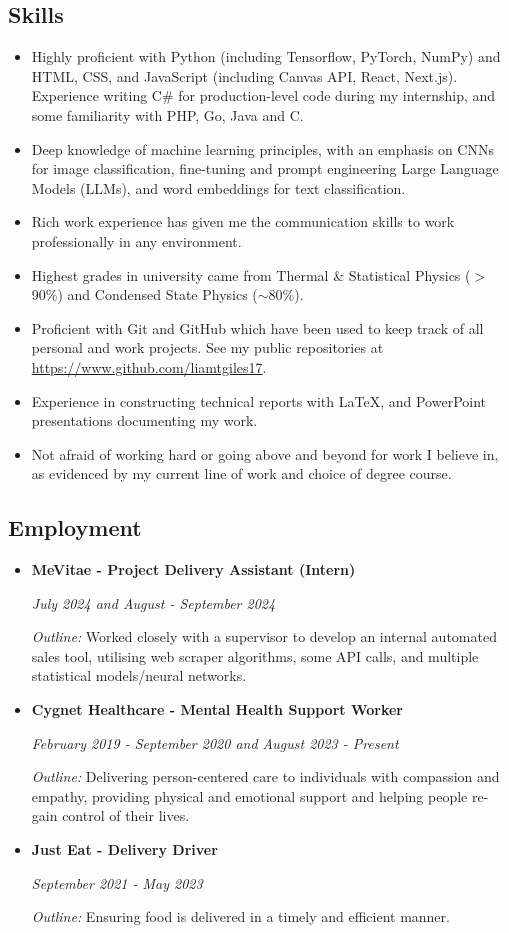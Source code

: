 \documentclass[11pt, a4paper, draft]{article}
\begin{document}
\subsection*{Skills}
\begin{itemize}
    \item Highly proficient with Python (including Tensorflow, PyTorch, NumPy) and HTML, CSS, and JavaScript (including Canvas API, React, Next.js). Experience writing C\# for production-level code during my internship, and some familiarity with PHP, Go, Java and C.
    \item Deep knowledge of machine learning principles, with an emphasis on CNNs for image classification, fine-tuning and prompt engineering Large Language Models (LLMs), and word embeddings for text classification.
    \item Rich work experience has given me the communication skills to work professionally in any environment.
    \item Highest grades in university came from Thermal \& Statistical Physics ($>$90\%) and Condensed State Physics ($\sim$80\%).
    \item Proficient with Git and GitHub which have been used to keep track of all personal and work projects. See my public repositories at \url{https://www.github.com/liamtgiles17}.
    \item Experience in constructing technical reports with \LaTeX, and PowerPoint presentations documenting my work.
    \item Not afraid of working hard or going above and beyond for work I believe in, as evidenced by my current line of work and choice of degree course.
\end{itemize}

\subsection*{Employment}
\begin{itemize}
    \item \textbf{MeVitae - Project Delivery Assistant (Intern)}
    
        \textit{July 2024 and August - September 2024}

        \textit{Outline:} Worked closely with a supervisor to develop an internal automated sales tool, utilising web scraper algorithms, some API calls, and multiple statistical models/neural networks.
    \item \textbf{Cygnet Healthcare - Mental Health Support Worker}
    
        \textit{February 2019 - September 2020 and August 2023 - Present}

        \textit{Outline:} Delivering person-centered care to individuals with compassion and empathy, providing physical and emotional support and helping people re-gain control of their lives.
    \item \textbf{Just Eat - Delivery Driver}
    
        \textit{September 2021 - May 2023}

        \textit{Outline:} Ensuring food is delivered in a timely and efficient manner.
\end{itemize}
\end{document}

